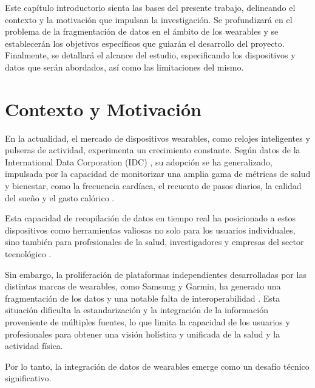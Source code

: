 
Este capítulo introductorio sienta las bases del presente trabajo, delineando el contexto y la motivación que impulsan la investigación. Se profundizará en el problema de la fragmentación de datos en el ámbito de los wearables y se establecerán los objetivos específicos que guiarán el desarrollo del proyecto. Finalmente, se detallará el alcance del estudio, especificando los dispositivos y datos que serán abordados, así como las limitaciones del mismo.

\section{Contexto y Motivación}

En la actualidad, el mercado de dispositivos wearables, como relojes inteligentes y pulseras de actividad, experimenta un crecimiento constante. Según datos de la International Data Corporation (IDC) \cite{IDCWearables},  su adopción se ha generalizado, impulsada por la capacidad de monitorizar una amplia gama de métricas de salud y bienestar, como la frecuencia cardíaca, el recuento de pasos diarios, la calidad del sueño y el gasto calórico \cite{IDCWearables}.

Esta capacidad de recopilación de datos en tiempo real ha posicionado a estos dispositivos como herramientas valiosas no solo para los usuarios individuales, sino también para profesionales de la salud, investigadores y empresas del sector tecnológico \cite{ConsumerHealthWearables}.

Sin embargo, la proliferación de plataformas independientes desarrolladas por las distintas marcas de wearables, como Samsung y Garmin, ha generado una fragmentación de los datos y una notable falta de interoperabilidad \cite{serpush2022wearable}. Esta situación dificulta la estandarización y la integración de la información proveniente de múltiples fuentes, lo que limita la capacidad de los usuarios y profesionales para obtener una visión holística y unificada de la salud y la actividad física.

Por lo tanto, la integración de datos de wearables emerge como un desafío técnico significativo.


